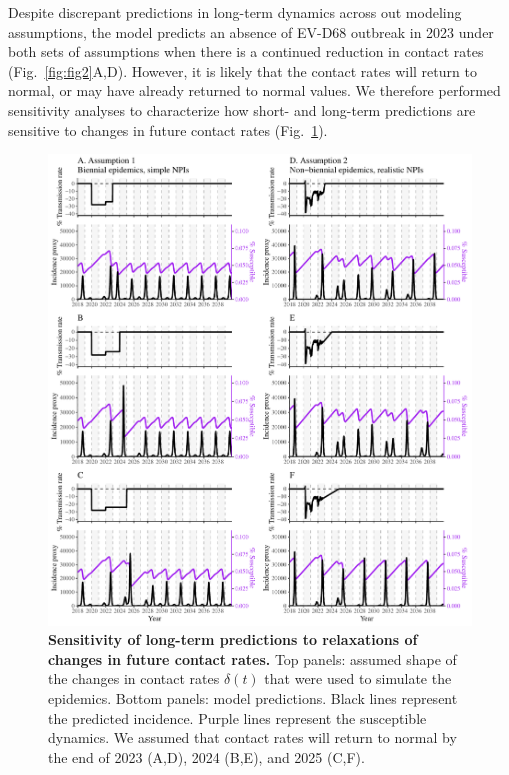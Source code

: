 \documentclass[12pt]{article}
\newcommand{\fref}[1]{Fig.~\ref{fig:#1}}
\begin{document}
Despite discrepant predictions in long-term dynamics across out modeling assumptions, the model predicts an absence of EV-D68 outbreak in 2023 under both sets of assumptions when there is a continued reduction in contact rates (\fref{fig2}A,D).
However, it is likely that the contact rates will return to normal, or may have already returned to normal values.
We therefore performed sensitivity analyses to characterize how short- and long-term predictions are sensitive to changes in future contact rates (\fref{fig3}).

\begin{figure}[!th]
\includegraphics[width=\textwidth]{../figure_pub/figure3.pdf}
\caption{
\textbf{Sensitivity of long-term predictions to relaxations of changes in future contact rates.}
Top panels: assumed shape of the changes in contact rates $\delta(t)$ that were used to simulate the epidemics.
Bottom panels: model predictions.
Black lines represent the predicted incidence.
Purple lines represent the susceptible dynamics.
We assumed that contact rates will return to normal by the end of 2023 (A,D), 2024 (B,E), and 2025 (C,F).
}
\label{fig:fig3}
\end{figure}
\end{document}
